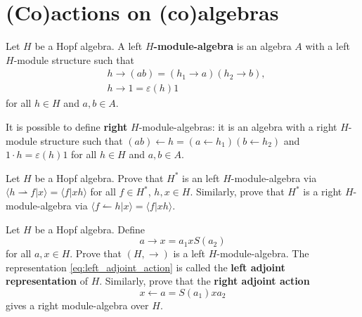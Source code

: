 
\section{(Co)actions on (co)algebras}

\begin{definition}
\label{def:module_algebra}
Let $H$ be a Hopf algebra. A left \textbf{$H$-module-algebra} is an algebra
$A$ with a left $H$-module structure such that
\begin{align*}
&h\rightarrow(ab)=(h_{1}\rightarrow a)(h_{2}\rightarrow b),\\
&h\rightarrow1=\varepsilon(h)1
\end{align*}
for all $h\in H$ and $a,b\in A$. 
\end{definition}

It is possible to define \textbf{right} $H$-module-algebras: it is an
algebra with a right $H$-module structure such that $(ab)\leftarrow
h=(a\leftarrow h_{1})(b\leftarrow h_{2})$ and $1\cdot h=\varepsilon(h)1$ for
all $h\in H$ and $a,b\in A$. 

\begin{exercise}
Let $H$ be a Hopf algebra.  Prove that $H^*$ is an left $H$-module-algebra
via  $\langle h\rightharpoonup f|x\rangle=\langle f|xh\rangle$ for all $f\in
H^*$, $h,x\in H$.  Similarly, prove that $H^*$ is a right $H$-module-algebra
via $\langle f\leftharpoonup h|x\rangle=\langle f|xh\rangle$.
\end{exercise}

\begin{exercise}
\label{exercise:adjoint}
Let $H$ be a Hopf algebra. Define 
\begin{equation}
a\rightarrow x=a_{1}xS(a_{2})\label{eq:left_adjoint_action}
\end{equation}
for all $a,x\in H$. Prove that $(H,\rightarrow)$ is a left $H$-module-algebra.
The representation \ref{eq:left_adjoint_action} is called the \textbf{left
adjoint representation} of $H$. Similarly, prove that the \textbf{right
adjoint action}
\begin{equation}
x\leftarrow a=S(a_{1})xa_{2}\label{eq:right_adjoint_action}
\end{equation}
gives a right module-algebra over $H$.
\end{exercise}

